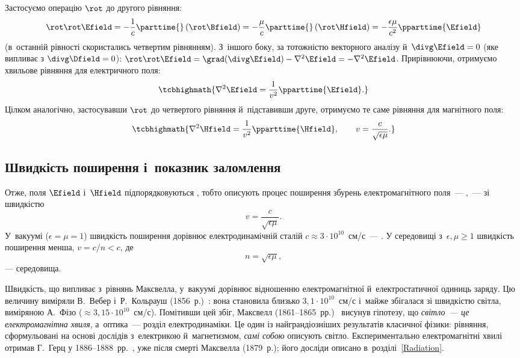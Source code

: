 Застосуємо операцію $\rot$ до другого рівняння:
\begin{equation*}
	\rot\rot\Efield = -\frac1c\parttime{}\left(\rot\Bfield\right) = -\frac\mu{c}\parttime{}\left(\rot\Hfield\right) = -\frac{\epsilon\mu}{c^2}\pparttime{\Efield}
\end{equation*}
(в~останній рівності скористались четвертим рівнянням). З~іншого боку, за тотожністю векторного аналізу й~$\divg\Efield=0$ (яке випливає з
$\divg\Dfield=0$): $\rot\rot\Efield = \grad(\divg\Efield)-\nabla^2\Efield = -\nabla^2\Efield$. Прирівнюючи, отримуємо хвильове рівняння для
електричного поля:
\begin{equation}\label{eq:WaveEqE}
	\tcbhighmath{
		\nabla^2\Efield = \frac1{v^2}\pparttime{\Efield}.
	}
\end{equation}
Цілком аналогічно, застосувавши $\rot$ до четвертого рівняння й~підставивши друге, отримуємо те саме рівняння для магнітного поля:
\begin{equation}\label{eq:WaveEqH}
	\tcbhighmath{
		\nabla^2\Hfield = \frac1{v^2}\pparttime{\Hfield}, \qquad v = \frac{c}{\sqrt{\epsilon\mu}}.
	}
\end{equation}

\subsection*{Швидкість поширення і~показник заломлення}

Отже, поля $\Efield$ і~$\Hfield$ підпорядковуються , тобто описують процес поширення збурень електромагнітного поля~--- ,~--- зі швидкістю
\begin{equation}\label{eq:WaveSpeed}
	v = \frac{c}{\sqrt{\epsilon\mu}}.
\end{equation}
У~вакуумі ($\epsilon=\mu=1$) швидкість поширення дорівнює електродинамічній сталій $c\approx3\cdot10^{10}$~см/с~--- . У
середовищі з~$\epsilon,\mu\geqslant1$ швидкість поширення менша, $v=c/n<c$, де
\begin{equation}\label{eq:RefractiveIndex}
	n = \sqrt{\epsilon\mu},
\end{equation}
---  середовища.

\begin{Historical}
	Швидкість, що випливає з~рівнянь Максвелла, у~вакуумі дорівнює відношенню електромагнітної й~електростатичної одиниць заряду. Цю величину виміряли В.~Вебер і~Р.~Кольрауш (1856~р.)~\cite{WeberKohlrausch1856}: вона становила близько $3{,}1\cdot10^{10}$~см/с і~майже збігалася зі швидкістю світла, виміряною А.~Фізо ($\approx3{,}15\cdot10^{10}$~см/с). Помітивши цей збіг, Максвелл (1861--1865~рр.)~\cite{Maxwell1865} висунув гіпотезу, що \emph{світло~--- це електромагнітна хвиля}, а~оптика~--- розділ електродинаміки. Це один із найграндіозніших результатів класичної фізики: рівняння, сформульовані на основі дослідів з~електрикою й~магнетизмом, \emph{самі собою} описують світло. Експериментально електромагнітні хвилі отримав Г.~Герц у 1886--1888~рр.~\cite{Hertz1893ElectricWaves}, уже після смерті Максвелла (1879~р.); його досліди описано в~розділі~\ref{Radiation}.
\end{Historical}

